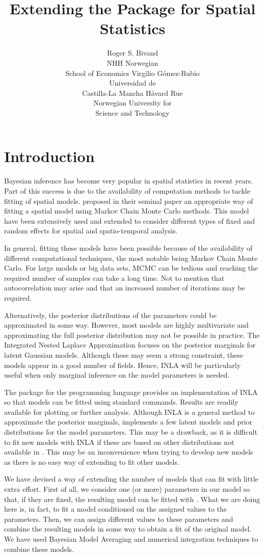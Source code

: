 \documentclass[article]{jss}
\author{Roger S. Bivand\\NHH Norwegian\\ School of Economics \And 
Virgilio G\'omez-Rubio\\Universidad de\\ Castilla-La Mancha 
\And H\r{a}vard Rue\\Norwegian University for\\ Science and Technology
}
\title{Extending the \pkg{R-INLA} Package for Spatial Statistics}
\begin{document}
\section[Introduction]{Introduction}


Bayesian inference has become very popular in spatial statistics in recent
years. Part of this success is due to the availability of computation methods
to tackle fitting of spatial models. \citet{besagetal:1991} proposed in their
seminal paper an appropriate way of fitting a spatial model using Markov Chain
Monte Carlo methods. This model have been extensively used and extended to
consider different types of fixed and random effects for spatial and
spatio-temporal analysis.

In general, fitting these models have been possible because of the availability
of different computational techniques, the most notable being Markov Chain
Monte Carlo. For large models or big data sets, MCMC can be tedious and
reaching the required number of samples can take a long time. Not to mention
that autocorrelation may arise and that an increased number of iterations may
be required.

Alternatively, the posterior distributions of the parameters could be
approximated in some way. However, most models are highly multivariate and
approximating the full posterior distribution may not be possible in practice.
The Integrated Nested Laplace Approximation \citep[][INLA]{isi:000264374200002} focuses on
the posterior marginals for latent Gaussian models. Although these may seem
a strong constraint, these models appear in a good number of fields. 
Hence, INLA will be particularly useful when  only
marginal inference on the model parameters is needed.

The  package\citep{rinla:2013} for the  programming language provides
an implementation of INLA so that models can be fitted using standard 
 commands. Results are readily available for plotting or
further analysis. Although INLA is a general method to approximate the
posterior marginals,  implements a few latent models and prior
distributions for the model parameters.
This may be a drawback, as it is difficult to fit new models with INLA if these
are based on other distributions not available in .  This may be an
inconvenience when trying to develop new models as there is no easy way of
extending  to fit other models.

We have devised a way of extending the number of models that  can
fit with little extra effort. First of all, we consider one (or more)
parameters in our model so that, if they are fixed, the resulting model can be
fitted with . What we are doing here is, in fact, to fit a model
conditioned on the assigned values to the parameters. Then, we can assign
different values to these parameters and combine the resulting models in some
way to obtain a fit of the original model. We have used Bayesian Model
Averaging and numerical integration techniques to combine these models.
\end{document}
